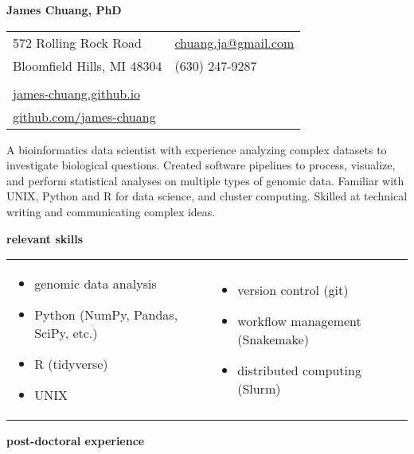 \documentclass[11pt, a4paper]{article}
\begin{document}
\textbf{\LARGE James Chuang, PhD} \\

\begin{tabularx}{9.8cm}{@{}Xl}
    572 Rolling Rock Road & \href{mailto:chuang.ja@gmail.com}{chuang.ja@gmail.com} \\
    Bloomfield Hills, MI 48304 & (630) 247-9287 \\
    \\
    \href{https://james-chuang.github.io}{james-chuang.github.io} \\
    \href{https://github.com/james-chuang}{github.com/james-chuang} \\
\end{tabularx}

\vspace{1em}
\noindent\hrulefill
\vspace{1em}

A bioinformatics data scientist with experience analyzing complex datasets to investigate biological questions.
Created software pipelines to process, visualize, and perform statistical analyses on multiple types of genomic data.
Familiar with UNIX, Python and R for data science, and cluster computing.
Skilled at technical writing and communicating complex ideas.

\vspace{1em}
\textbf{\Large relevant skills}

\begin{tabularx}{0.95\textwidth}{XX}
    \begin{itemize}[topsep=0pt, itemsep=-3pt]
        \item genomic data analysis
        \item Python (NumPy, Pandas, SciPy, etc.)
        \item R (tidyverse)
        \item UNIX
    \end{itemize} &
    \begin{itemize}[topsep=0pt, itemsep=-3pt]
        \item version control (git)
        \item workflow management (Snakemake)
        \item distributed computing (Slurm)
    \end{itemize} \\
\end{tabularx}

\textbf{\Large post-doctoral experience}
\end{document}
